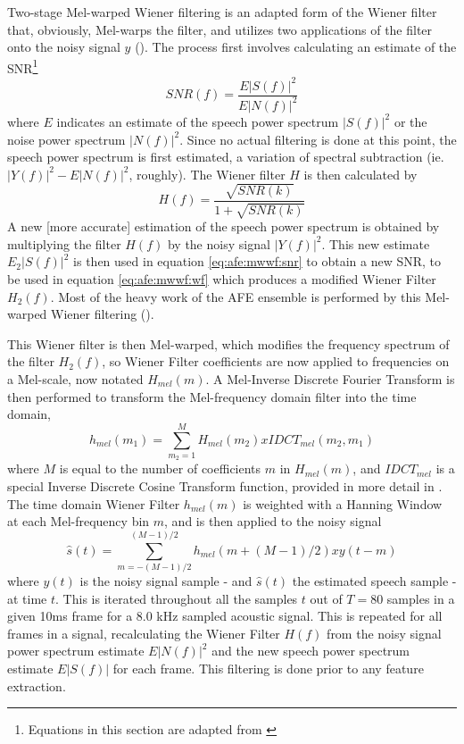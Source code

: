 Two-stage Mel-warped Wiener filtering is an adapted form of the Wiener filter that, obviously, Mel-warps the filter, and utilizes two applications of the filter onto the noisy signal $y$ (\cite{etsi:02}).  The process first involves calculating an estimate of the SNR\footnote{Equations in this section are adapted from \cite{etsi:02}} \begin{equation}\label{eq:afe:mwwf:snr} SNR(f) = \dfrac{E|S(f)|^2}{E|N(f)|^2} \end{equation} where $E$ indicates an estimate of the speech power spectrum $|S(f)|^2$ or the noise power spectrum $|N(f)|^2$.  Since no actual filtering is done at this point, the speech power spectrum is first estimated, a variation of spectral subtraction (ie. $|Y(f)|^2 - E|N(f)|^2$, roughly).  The Wiener filter $H$ is then calculated by \begin{equation}\label{eq:afe:mwwf:wf} H(f) = \dfrac{\sqrt{SNR(k)}}{1+\sqrt{SNR(k)}} \end{equation}  A new [more accurate] estimation of the speech power spectrum is obtained by multiplying the filter $H(f)$ by the noisy signal $|Y(f)|^2$.  This new estimate $E_2|S(f)|^2$ is then used in equation \ref{eq:afe:mwwf:snr} to obtain a new SNR, to be used in equation \ref{eq:afe:mwwf:wf} which produces a modified Wiener Filter $H_2(f)$.  Most of the heavy work of the AFE ensemble is performed by this Mel-warped Wiener filtering (\cite{li:14}).

This Wiener filter is then Mel-warped, which modifies the frequency spectrum of the filter $H_2(f)$, so Wiener Filter coefficients are now applied to frequencies on a Mel-scale, now notated $H_{mel}(m)$.  A Mel-Inverse Discrete Fourier Transform is then performed to transform the Mel-frequency domain filter into the time domain, \begin{equation} h_{mel}(m_1) = \sum_{m_2=1}^{M} H_{mel}(m_2) x IDCT_{mel}(m_2,m_1) \end{equation} where $M$ is equal to the number of \DIFdelbegin {}\DIFdelend \DIFaddbegin {}\DIFaddend coefficients $m$ in $H_{mel}(m)$, and $IDCT_{mel}$ is a special Inverse Discrete Cosine Transform function, provided in more detail in \cite{etsi:02}.  The time domain Wiener Filter $h_{mel}(m)$ is weighted with a Hanning Window at each Mel-frequency bin $m$, and is then applied to the noisy signal \begin{equation} \hat{s}(t) = \sum_{m=-(M-1)/2}^{(M-1)/2} h_{mel}(m+(M-1)/2) x y(t-m) \end{equation} where $y(t)$ is the noisy signal sample - and $\hat{s}(t)$ the estimated speech sample - at time $t$.  This is iterated throughout all the samples $t$ out of $T=80$ samples in a given 10ms frame for a 8.0 kHz sampled acoustic signal.  This is repeated for all frames in a signal, recalculating the Wiener Filter $H(f)$ from the noisy signal power spectrum estimate $E|N(f)|^2$ and the new speech power spectrum estimate $E|S(f)|$ for each frame.  This filtering is done prior to any feature extraction.

